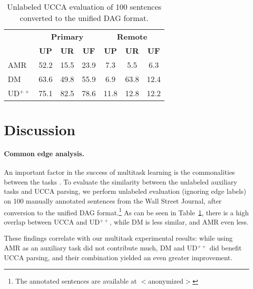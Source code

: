 \documentclass[11pt,a4paper]{article}
\begin{document}
\begin{table}
\begin{tabular}{l|ccc|ccc}
& \multicolumn{3}{c|}{\footnotesize \bf Primary} & \multicolumn{3}{c}{\footnotesize \bf Remote} \\
& \footnotesize \textbf{UP} & \footnotesize \textbf{UR} & \footnotesize \textbf{UF}
& \footnotesize \textbf{UP} & \footnotesize \textbf{UR} & \footnotesize \textbf{UF} \\
\hline
AMR & 52.2 & 15.5 & 23.9 & 7.3 & 5.5 & 6.3 \\
DM & 63.6 & 49.8 & 55.9 & 6.9 & 63.8 & 12.4 \\
UD$^{++}$ & 75.1 & 82.5 & 78.6 & 11.8 & 12.8 & 12.2
\end{tabular}
\caption{Unlabeled UCCA evaluation of 100 sentences converted to the unified DAG format.
\label{tab:common}}
\end{table}


\section{Discussion}\label{sec:discussion}

\paragraph{Common edge analysis.}
An important factor in the success of multitask learning is the commonalities between the tasks
\cite{E17-2026,E17-1005}.
To evaluate the similarity between the unlabeled auxiliary tasks and UCCA parsing,
we perform unlabeled evaluation (ignoring edge labels)
on 100 manually annotated sentences from the
Wall Street Journal, after conversion to the unified DAG format.\footnote{The annotated
sentences are available at $<$anonymized$>$}
As can be seen in Table~\ref{tab:common}, there is a high overlap between
UCCA and UD$^{++}$, while DM is less similar, and AMR even less.

These findings correlate with our multitask experimental results:
while using AMR as an auxiliary task did not contribute much, DM and UD$^{++}$ did benefit UCCA
parsing, and their combination yielded an even greater improvement.
\end{document}
